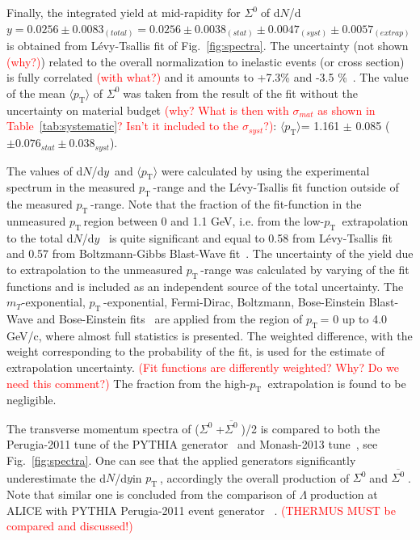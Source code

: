 \documentclass[ALICE,manyauthors]{cernphprep}
\newcommand{\mpt}{\langle p_{\mathrm{T}}\rangle}
\newcommand{\dndy}{d$N$/d$y$}
\newcommand{\sig}{\ensuremath{\Sigma^0  \; }}
\newcommand{\asig}{\ensuremath{\overline{\Sigma^0} \; }}
\newcommand{\lam}{\ensuremath{\Lambda \; }}
\newcommand{\meanpt}{ \ensuremath{\langle p_{\mathrm{T}} \rangle}}
\newcommand{\pt}{\ensuremath{p_{\mathrm{T}\; }}}
\newcommand{\red}{\textcolor{red}}
\begin{document}
Finally, the integrated yield at mid-rapidity for \sig of d$N$/d$y = 0.0256  \pm 0.0083_{(total)} = 0.0256   \pm 0.0038_{(stat)} 
\pm 0.0047_{(syst)} \pm 0.0057_{(extrap)}$ is obtained from L\'{e}vy-Tsallis fit of Fig.~\ref{fig:spectra}.
The uncertainty (not shown \red{(why?)}) related  to the overall normalization to inelastic events (or cross section) 
is fully correlated \red{(with what?)} and it amounts to +7.3\% and -3.5 \%~\cite{cite:ALICE-inelasticXsection,cite:Xi_pp}.
The value of the mean $\mpt$ of  \sig was taken from the result of the fit without the uncertainty on material 
budget \red{(why? What is then with $\sigma_{mat}$ as shown in Table~\ref{tab:systematic}?
Isn't it included to the $\sigma_{syst}$?)}: \meanpt = 1.161 $\pm$ 0.085 ($\pm 0.076_{stat} \pm 0.038_{syst}$). 

The values of \dndy~and $\mpt$ were calculated by using the experimental 
spectrum in the measured \pt-range and the L\'{e}vy-Tsallis fit function outside of the measured \pt-range.
Note that the fraction of the fit-function in the unmeasured \pt region between 0 and 1.1 GeV, i.e.
 from the low-$\pt$ extrapolation to the total \dndy~ is quite significant and equal  
to 0.58 from L\'{e}vy-Tsallis fit and 0.57 from Boltzmann-Gibbs Blast-Wave fit~\cite{cite:blastwave}.
The uncertainty of the yield due to extrapolation to the unmeasured \pt-range 
was calculated by varying of the fit functions and is included as an independent source of the total uncertainty.
The $m_T$-exponential,  \pt-exponential,   Fermi-Dirac,  Boltzmann, Bose-Einstein Blast-Wave and 
Bose-Einstein fits~\cite{cite:STAR-ratio_to_pion,cite:STAR-Kstar-2005} are applied
from the region of \pt = 0 up to  4.0 GeV/c, where almost full statistics is presented.  
The weighted difference, with the weight corresponding to the probability of the fit, is used for the 
estimate of extrapolation uncertainty. \red{(Fit functions are differently weighted? Why? Do we need this comment?)}
The fraction from the high-$\pt$ extrapolation is found to be negligible. 

The transverse momentum spectra of (\sig+\asig)/2 is compared to both the Perugia-2011 tune of
the PYTHIA generator~\cite{cite:pythia6} and Monash-2013 tune~\cite{cite:PYTHIA-8-Monash-gener}, 
see Fig.~\ref{fig:spectra}. One can see that the applied generators significantly underestimate the \dndy in \pt, 
accordingly the overall production of \sig and \asig. Note that similar one is concluded from the 
comparison of \lam production at ALICE with PYTHIA Perugia-2011 event generator
~\cite{cite:lambda_pp,cite:Lam-PLB14}. \red{(THERMUS MUST be compared and discussed!)}
\end{document}
